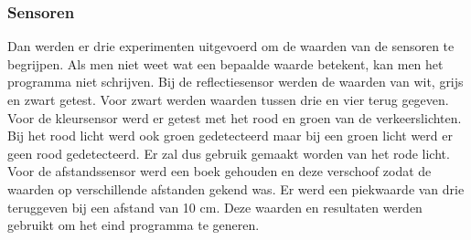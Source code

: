 \documentclass[a4paper,twoside,kulak]{kulakreport} %
\begin{document}

\subsubsection{Sensoren}

Dan werden er drie experimenten uitgevoerd om de waarden van de sensoren te begrijpen.
Als men niet weet wat een bepaalde waarde betekent, kan men het programma niet schrijven.
Bij de reflectiesensor werden de waarden van wit, grijs en zwart getest. 
Voor zwart werden waarden tussen drie en vier terug gegeven.  
Voor de kleursensor werd er getest met het rood en groen van de verkeerslichten.
Bij het rood licht werd ook groen gedetecteerd maar bij een groen licht werd er geen rood gedetecteerd.
Er zal dus gebruik gemaakt worden van het rode licht.
Voor de afstandssensor werd een boek gehouden en deze verschoof zodat de waarden op verschillende afstanden gekend was.
Er werd een piekwaarde van drie teruggeven bij een afstand van 10 cm. 
Deze waarden en resultaten werden gebruikt om het eind programma te generen.


\end{document}
